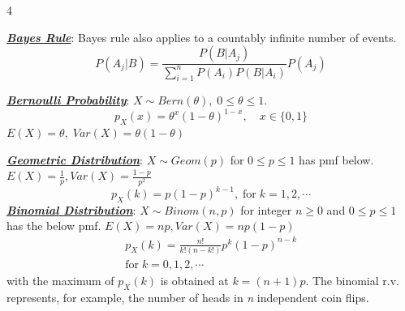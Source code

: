 \documentclass[12pt]{article}
\newcommand{\bulletPoint}[1]{\ul{\textit{\textbf{#1}}}}
\begin{document}
\singlespacing
\begin{multicols*}{4}
\tiny
\raggedright

\bulletPoint{Bayes Rule}:
Bayes rule also applies to a countably infinite number of events.
\useshortskip \begin{equation*}
    P(A_j | B) = \frac{P(B | A_j)}{\sum^{n}_{i=1}P(A_i)P(B | A_i)} P(A_j)
\end{equation*}



\bulletPoint{Bernoulli Probability}:
$X \sim Bern(\theta), \; 0 \leq \theta \leq 1$. 
\useshortskip \begin{equation*}
    p_X(x)=\theta^x(1-\theta)^{1-x}, \quad x\in\{0,1\}
\end{equation*}
$E(X)=\theta,\; Var(X)=\theta(1-\theta)$


\bulletPoint{Geometric Distribution}:
$X \sim Geom(p)$ for $0 \leq p \leq 1$ has pmf below. $E(X)=\frac{1}{p}, Var(X)=\frac{1-p}{p^2}$
\useshortskip \begin{equation*}
    p_X(k) = p(1-p)^{k-1}, \; \text{for} \; k=1,2,\cdots
\end{equation*}
\bulletPoint{Binomial Distribution}:
$X \sim Binom(n, p)$ for  integer $n\geq 0$ and $0 \leq p \leq 1$ has the below pmf. $E(X)=np, Var(X)=np(1-p)$
\useshortskip \begin{equation*}
\begin{split}
        p_X(k) = \frac{n!}{k!(n-k!)} p^k (1-p)^{n-k} \\
        \text{for} \; k=0,1,2,\cdots
\end{split}
\end{equation*}
with the maximum of $p_X(k)$ is obtained at $k=(n+1)p$. The binomial r.v. represents, for example, the number of heads in \textit{n} independent coin flips.



\end{multicols*}
\end{document}
